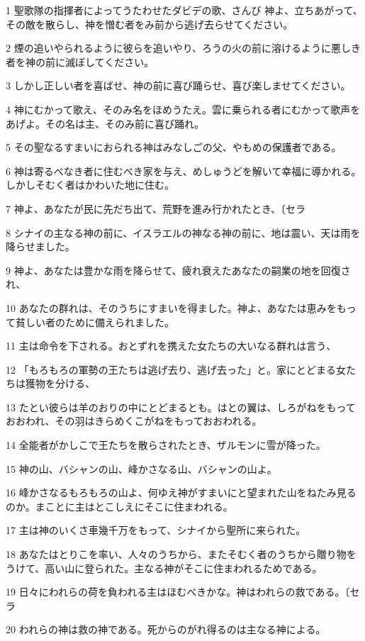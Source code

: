 \par 1 聖歌隊の指揮者によってうたわせたダビデの歌、さんび 神よ、立ちあがって、その敵を散らし、神を憎む者をみ前から逃げ去らせてください。
\par 2 煙の追いやられるように彼らを追いやり、ろうの火の前に溶けるように悪しき者を神の前に滅ぼしてください。
\par 3 しかし正しい者を喜ばせ、神の前に喜び踊らせ、喜び楽しませてください。
\par 4 神にむかって歌え、そのみ名をほめうたえ。雲に乗られる者にむかって歌声をあげよ。その名は主、そのみ前に喜び踊れ。
\par 5 その聖なるすまいにおられる神はみなしごの父、やもめの保護者である。
\par 6 神は寄るべなき者に住むべき家を与え、めしゅうどを解いて幸福に導かれる。しかしそむく者はかわいた地に住む。
\par 7 神よ、あなたが民に先だち出て、荒野を進み行かれたとき、〔セラ
\par 8 シナイの主なる神の前に、イスラエルの神なる神の前に、地は震い、天は雨を降らせました。
\par 9 神よ、あなたは豊かな雨を降らせて、疲れ衰えたあなたの嗣業の地を回復され、
\par 10 あなたの群れは、そのうちにすまいを得ました。神よ、あなたは恵みをもって貧しい者のために備えられました。
\par 11 主は命令を下される。おとずれを携えた女たちの大いなる群れは言う、
\par 12 「もろもろの軍勢の王たちは逃げ去り、逃げ去った」と。家にとどまる女たちは獲物を分ける、
\par 13 たとい彼らは羊のおりの中にとどまるとも。はとの翼は、しろがねをもっておおわれ、その羽はきらめくこがねをもっておおわれる。
\par 14 全能者がかしこで王たちを散らされたとき、ザルモンに雪が降った。
\par 15 神の山、バシャンの山、峰かさなる山、バシャンの山よ。
\par 16 峰かさなるもろもろの山よ、何ゆえ神がすまいにと望まれた山をねたみ見るのか。まことに主はとこしえにそこに住まわれる。
\par 17 主は神のいくさ車幾千万をもって、シナイから聖所に来られた。
\par 18 あなたはとりこを率い、人々のうちから、またそむく者のうちから贈り物をうけて、高い山に登られた。主なる神がそこに住まわれるためである。
\par 19 日々にわれらの荷を負われる主はほむべきかな。神はわれらの救である。〔セラ
\par 20 われらの神は救の神である。死からのがれ得るのは主なる神による。
